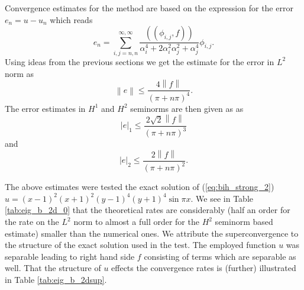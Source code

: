 \documentclass[a4paper,10pt]{article}
\newcommand{\norm}[1]{\ensuremath{\left\|#1\right\|}}
\newcommand{\seminorm}[1]{\ensuremath{\left|#1\right|}}
\newcommand{\Inner}[2]{\ensuremath{\left(\left(#1, #2\right)\right)}}
\begin{document}
  Convergence estimates for the method are based on the expression for the error
  $e_n=u-u_n$ which reads
  \[
    e_n = \sum\limits_{i, j = n, n}^{\infty, \infty} \frac{\Inner{\phi_{i,
    j}}{f}}{\alpha_i^4 + 2\alpha_i^2\alpha_j^2 + \alpha_j^4}\phi_{i, j}.
  \]
  Using ideas from the previous sections we get the estimate for the error
  in $L^2$ norm
  as
  \[
    \norm{e} \leq \frac{4\norm{f}}{\left(\pi + n\pi \right)^4}.
  \]
  The error estimates in $H^1$ and $H^2$ seminorms are then given as 
  as
  \[
    \seminorm{e}_1 \leq \frac{2\sqrt{2}\norm{f}}{\left(\pi + n\pi \right)^3}
  \]
  and
  \[
    \seminorm{e}_2 \leq \frac{2\norm{f}}{\left(\pi + n\pi \right)^2}.
  \]

  The above estimates were tested the exact solution of (\ref{eq:bih_strong_2})
  $u = (x - 1)^2(x + 1)^2 (y - 1)^4 (y + 1)^4 \sin{\pi x}.$ We see in Table
  \ref{tab:eig_b_2d_0} that the theoretical rates are considerably (half an order
  for the rate on the $L^2$ norm to almost a full order for the $H^2$ seminorm
  based estimate) smaller than the numerical ones. We attribute the superconvergence
  to the structure of the exact solution used in the test. The employed function
  $u$ was separable leading to right hand side $f$ consisting of terms which are
  separable as well. That the structure of $u$ effects the convergence rates 
  is (further) illustrated in Table \ref{tab:eig_b_2dsup}.
\end{document}
